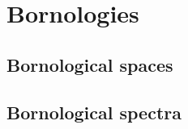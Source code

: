 \section{Bornologies}
    \subsection{Bornological spaces}
    
    \subsection{Bornological spectra}